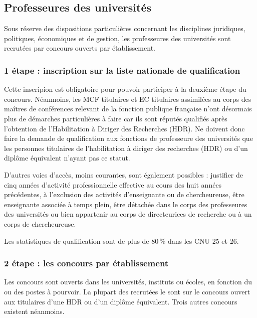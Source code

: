 \subsection{Professeur\mp e\mp s des universit\'es}

Sous r\'eserve des dispositions particuli\`eres concernant les disciplines juridiques, politiques,
\'economiques et de gestion, les professeur\mp e\mp s des universit\'es sont recrut\'e\mp e\mp s par concours ouverts par \'etablissement.

\subsubsection*{1\iere{} \'etape : inscription sur la liste nationale de qualification}

Cette inscripion est obligatoire pour pouvoir participer \`a la deuxi\`eme \'etape du concours. N\'eanmoins, les MCF titulaires et EC titulaires assimil\'e\mp e\mp s au corps des ma\^itres de conf\'erences relevant de la fonction publique française n'ont d\'esormais plus de d\'emarches particuli\`eres \`a faire car ils sont r\'eput\'es qualifi\'es apr\`es l'obtention de l'Habilitation \`a Diriger des Recherches (HDR). Ne doivent donc faire la demande de qualification aux fonctions de professeur\mp e des universit\'es que les personnes titulaires de l'habilitation \`a diriger des recherches (HDR) ou d'un dipl\^ome \'equivalent n'ayant pas ce statut.

D'autres voies d'acc\`es, moins courantes, sont \'egalement possibles :
justifier de cinq ann\'ees d'activit\'e professionnelle effective au cours des huit ann\'ees pr\'ec\'edentes,
\`a l'exclusion des activit\'es d'enseignant\mp e ou de chercheur\mp euse,
\^etre enseignant\mp e associ\'e\mp e \`a temps plein,
\^etre d\'etach\'e\mp e dans le corps des professeur\mp e\mp s des universit\'es
ou bien appartenir au corps de directeur\mp ice\mp s de recherche ou \`a un corps de chercheur\mp euse.

Les statistiques de qualification sont de plus de 80\,\% dans les CNU 25 et 26.

\subsubsection*{2\ieme{} \'etape : les concours par \'etablissement}

Les concours sont ouverts dans les universit\'es, instituts ou \'ecoles, en fonction du ou des postes \`a pourvoir.
La plupart des recrut\'e\mp e\mp s le sont sur le concours ouvert aux titulaires d'une HDR ou d'un dipl\^ome \'equivalent.
Trois autres concours existent n\'eanmoins.

